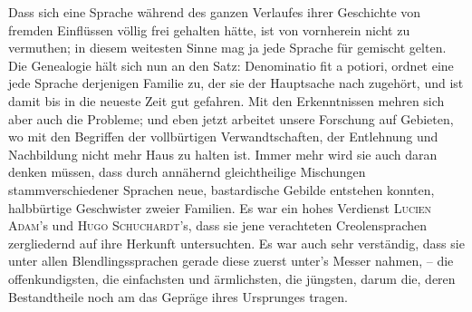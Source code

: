 {Dass sich eine Sprache während des ganzen Verlaufes ihrer Geschichte von fremden Einflüssen völlig frei gehalten hätte, ist von vornherein nicht zu vermuthen; in diesem weitesten Sinne mag ja jede Sprache für gemischt gelten. Die Genealogie hält sich nun an den Satz: Denominatio fit a potiori, ordnet eine jede Sprache derjenigen Familie zu, der sie der Hauptsache nach zugehört, und ist damit bis in die neueste Zeit gut gefahren. Mit den Erkenntnissen mehren sich aber auch die Probleme; und eben jetzt arbeitet unsere Forschung auf Gebieten, wo mit den Begriffen der vollbürtigen Verwandtschaften, der Entlehnung und Nachbildung nicht mehr Haus zu halten ist. Immer mehr wird sie auch daran denken müssen, dass durch annähernd gleichtheilige Mischungen stammverschiedener Sprachen neue, bastardische Gebilde entstehen konnten, halbbürtige Geschwister zweier Familien. Es war ein hohes Verdienst \textsc{Lucien Adam}’s und \textsc{Hugo Schuchardt}’s, dass sie jene verachteten Creolensprachen zergliedernd auf ihre Herkunft untersuchten. Es war auch sehr verständig, dass sie unter allen Blendlingssprachen gerade diese zuerst unter’s Messer nahmen, – die offenkundigsten, die einfachsten und ärm\-\label{fp.273}lichsten, die jüngsten, darum die, deren Bestandtheile noch am  das Gepräge ihres Ursprunges tragen.

}
